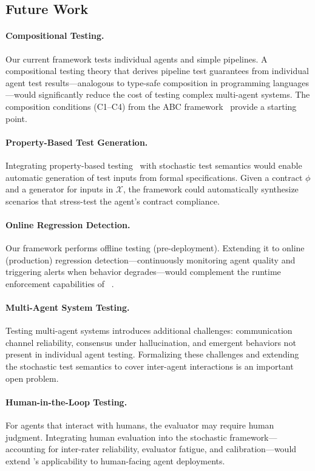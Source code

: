 \subsection{Future Work}
\label{sec:discussion:future}

\paragraph{Compositional Testing.}
Our current framework tests individual agents and simple pipelines.
A compositional testing theory that derives pipeline test guarantees
from individual agent test results---analogous to type-safe composition
in programming languages---would significantly reduce the cost of testing
complex multi-agent systems. The composition conditions (C1--C4) from
the ABC framework~\citep{bhardwaj2026abc} provide a starting point.

\paragraph{Property-Based Test Generation.}
Integrating property-based testing~\citep{claessen2000quickcheck} with
stochastic test semantics would enable automatic generation of test
inputs from formal specifications. Given a contract $\phi$ and a
generator for inputs in $\mathcal{X}$, the framework could automatically
synthesize scenarios that stress-test the agent's contract compliance.

\paragraph{Online Regression Detection.}
Our framework performs offline testing (pre-deployment). Extending it to
online (production) regression detection---continuously monitoring agent
quality and triggering alerts when behavior degrades---would complement
the runtime enforcement capabilities of
\agentassert{}~\citep{bhardwaj2026abc}.

\paragraph{Multi-Agent System Testing.}
Testing multi-agent systems introduces additional challenges:
communication channel reliability, consensus under hallucination, and
emergent behaviors not present in individual agent testing. Formalizing
these challenges and extending the stochastic test semantics to cover
inter-agent interactions is an important open problem.

\paragraph{Human-in-the-Loop Testing.}
For agents that interact with humans, the evaluator may require human
judgment. Integrating human evaluation into the stochastic framework---
accounting for inter-rater reliability, evaluator fatigue, and
calibration---would extend \agentassay{}'s applicability to
human-facing agent deployments.
